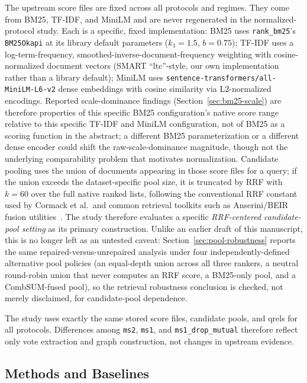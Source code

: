 \documentclass[manuscript,anonymous,review]{acmart}
\begin{document}
The upstream score files are fixed across all protocols and regimes. They come
from BM25, TF-IDF, and MiniLM and are never regenerated in the normalized-protocol
study. Each is a specific, fixed implementation: BM25 uses \texttt{rank\_bm25}'s
\texttt{BM25Okapi} at its library default parameters ($k_1=1.5$, $b=0.75$);
TF-IDF uses a log-term-frequency, smoothed-inverse-document-frequency
weighting with cosine-normalized document vectors (SMART ``ltc''-style, our
own implementation rather than a library default); MiniLM uses
\texttt{sentence-transformers/all-MiniLM-L6-v2} dense embeddings with
cosine similarity via L2-normalized encodings. Reported scale-dominance
findings (Section~\ref{sec:bm25-scale}) are therefore properties of this
specific BM25 configuration's native score range relative to this specific
TF-IDF and MiniLM configuration, not of BM25 as a scoring function in the
abstract; a different BM25 parameterization or a different dense encoder
could shift the raw-scale-dominance magnitude, though not the underlying
comparability problem that motivates normalization. Candidate pooling uses the union of documents appearing in those score
files for a query; if the union exceeds the dataset-specific pool size, it is
truncated by RRF with $k=60$ over the full native ranked lists, following the
conventional RRF constant used by Cormack et al.\ and common retrieval toolkits
such as Anserini/BEIR fusion utilities~\cite{cormack2009rrf}. The study
therefore evaluates a specific \emph{RRF-centered candidate-pool setting} as
its primary construction. Unlike an earlier draft of this manuscript, this is
no longer left as an untested caveat: Section~\ref{sec:pool-robustness}
reports the same repaired-versus-unrepaired analysis under four
independently-defined alternative pool policies (an equal-depth union across
all three rankers, a neutral round-robin union that never computes an RRF
score, a BM25-only pool, and a CombSUM-fused pool), so the retrieval
robustness conclusion is checked, not merely disclaimed, for
candidate-pool dependence.

The study uses exactly the same stored score files, candidate pools, and qrels
for all protocols. Differences among \texttt{ms2}, \texttt{ms1}, and
\texttt{ms1\_drop\_mutual} therefore reflect only vote extraction and graph
construction, not changes in upstream evidence.

\subsection{Methods and Baselines}
\label{sec:baselines}
\end{document}
